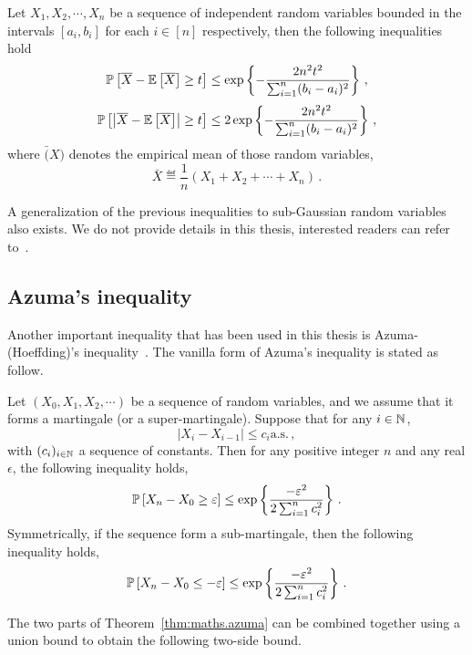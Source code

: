 \begin{theorem}\label{thm:maths.hoeffding}
\begin{leftbar}[theorembar]
    Let $X_1, X_2, \cdots, X_n$ be a sequence of independent random variables bounded in the intervals $[a_i,b_i]$ for each $i\in[n]$ respectively, then the following inequalities hold
    \[
        \mathbb{P}\left[\overline{X}-\mathbb{E}\left[\overline{X}\right] \geq t\right] \leq \exp\left\{-\frac{2n^2t^2}{\sum_{i=1}^n(b_i-a_i)^2}\right\}\,,
    \]
    \[
        \mathbb{P}\left[\left|\overline{X}-\mathbb{E}\left[\overline{X}\right]\right| \geq t\right] \leq 2\exp\left\{-\frac{2n^2t^2}{\sum_{i=1}^n(b_i-a_i)^2}\right\}\,,
    \]
    where $\bar(X)$ denotes the empirical mean of those random variables,
    \[
        \bar{X} \eqdef \frac{1}{n}(X_1+X_2+\cdots+X_n)\,.
    \]
\end{leftbar}
\end{theorem}

A generalization of the previous inequalities to sub-Gaussian random variables also exists. We do not provide details in this thesis, interested readers can refer to~\cite{vershynin2018}.

\subsection{Azuma's inequality}

Another important inequality that has been used in this thesis is Azuma-(Hoeffding)'s inequality~\citep{azuma1967}. The vanilla form of Azuma's inequality is stated as follow.

\begin{theorem}\label{thm:maths.azuma}
\begin{leftbar}[theorembar]
    Let $(X_0, X_1, X_2, \cdots)$ be a sequence of random variables, and we assume that it forms a martingale (or a super-martingale). Suppose that for any $i\in{\mathbb N}$,
    \[
        |X_i-X_{i-1}|\leq c_i \text{a.s.}\,,
    \]
    with $(c_i)_{i\in{\mathbb N}}$ a sequence of constants. Then for any positive integer $n$ and any real $\epsilon$, the following inequality holds,
    \[
        \mathbb{P}\left[X_n-X_0 \geq \varepsilon\right] \leq \exp\left\{\frac{-\varepsilon^2}{2\sum_{i=1}^n c_i^2}\right\}\,.
    \]
    Symmetrically, if the sequence form a sub-martingale, then the following inequality holds,
    \[
        \mathbb{P}\left[X_n-X_0 \leq -\varepsilon\right] \leq \exp\left\{\frac{-\varepsilon^2}{2\sum_{i=1}^n c_i^2}\right\}\,.
    \]
\end{leftbar}
\end{theorem}

The two parts of Theorem~\ref{thm:maths.azuma} can be combined together using a union bound to obtain the following two-side bound.

